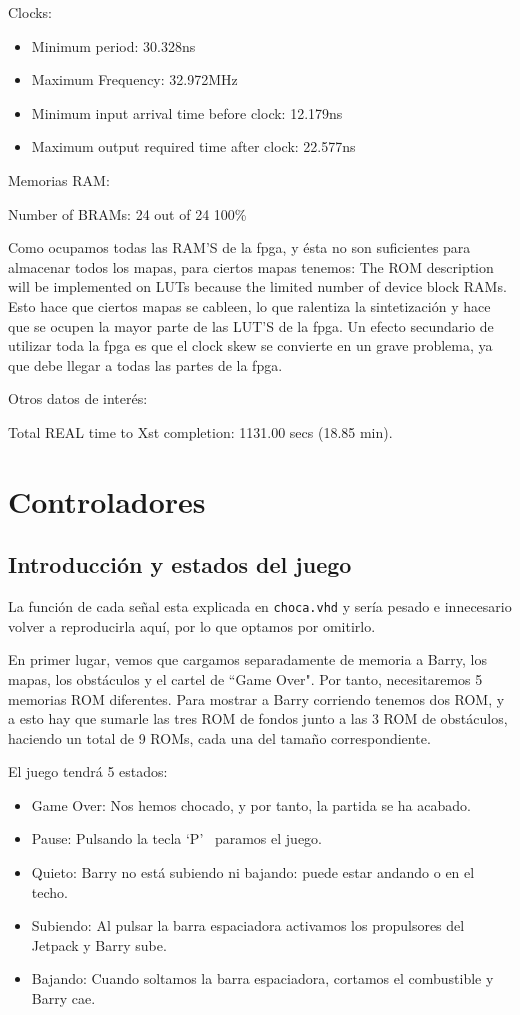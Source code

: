 \documentclass[11pt, a4paper, spanish, openright, twoside]{book}
\begin{document}
	Clocks:
	\begin{itemize}
	\item  Minimum period: 30.328ns 
	\item 	Maximum Frequency: 32.972MHz
 	\item  Minimum input arrival time before clock: 12.179ns
   	\item Maximum output required time after clock: 22.577ns

\end{itemize}
	Memorias RAM:
	
	Number of BRAMs:    24  out of     24   100\%  

	Como ocupamos todas las RAM'S de la fpga, y ésta no son suficientes para almacenar todos los mapas, para ciertos mapas tenemos:
		The ROM description  will be implemented on LUTs because the limited number of device block RAMs.
	Esto hace que ciertos mapas se cableen, lo que ralentiza la sintetización y hace que se ocupen la mayor parte de las LUT'S de la fpga.
	Un efecto secundario de utilizar toda la fpga es que el clock skew se convierte en un grave problema, ya que debe llegar a todas 
	 las partes de la fpga.

	Otros datos de interés:
	
	Total REAL time to Xst completion: 1131.00 secs (18.85 min).

\section{Controladores}
\subsection{Introducción y estados del juego}
La función de cada señal esta explicada en \texttt{choca.vhd} y sería pesado e innecesario volver a reproducirla aquí, por lo que optamos por omitirlo.

En primer lugar, vemos que cargamos separadamente de memoria a Barry,  los mapas, los obstáculos y el cartel de ``Game Over". Por tanto, necesitaremos 5 memorias ROM diferentes. Para mostrar a Barry corriendo tenemos dos ROM, y a esto hay que sumarle las tres ROM de fondos junto a las 3 ROM de obstáculos, haciendo un total de 9 ROMs, cada una del tamaño correspondiente. 

El juego tendrá 5 estados:
\begin{itemize}
\item Game Over: Nos hemos chocado, y por tanto, la partida se ha acabado.
\item Pause: Pulsando la tecla `P'  \ paramos el juego.
\item Quieto: Barry no está subiendo ni bajando: puede estar andando o en el techo.
\item Subiendo: Al pulsar la barra espaciadora activamos los propulsores del Jetpack y Barry sube.
\item Bajando: Cuando soltamos la barra espaciadora, cortamos el combustible y Barry cae.
\end{itemize}
\end{document}
